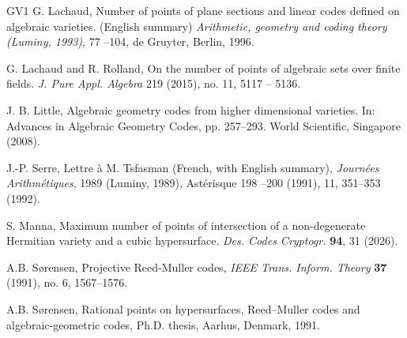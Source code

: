 \documentclass[10pt,a4paper,oneside]{amsproc}
\begin{document}
\begin{thebibliography}{GV1}
G. Lachaud, 
Number of points of plane sections and linear codes defined on algebraic varieties. (English summary) \emph{Arithmetic, geometry and coding theory (Luminy, 1993)}, 77 --104, de Gruyter, Berlin, 1996.


G. Lachaud and R. Rolland, On the number of points of algebraic sets over finite fields. \emph{J. Pure Appl. Algebra} 219 (2015), no. 11, 5117 -- 5136. 

J. B. Little, Algebraic geometry codes from higher dimensional varieties. In: Advances in Algebraic
Geometry Codes, pp. 257–293. World Scientific, Singapore (2008).

 J.-P. Serre, Lettre \`a M. Tsfasman (French, with English summary), \emph{Journ{\'e}es Arithm{\'e}tiques}, 1989 (Luminy, 1989), Ast{\'e}risque 198 --200 (1991), 11, 351--353 (1992).


S. Manna, Maximum number of points of intersection of a non-degenerate Hermitian variety and a cubic hypersurface. \emph{Des. Codes Cryptogr.} \textbf{94}, 31 (2026).

 A.B.  S{\o}rensen, Projective Reed-Muller codes, \emph{IEEE Trans. Inform. Theory} {\bf 37} (1991), no. 6, 1567--1576.

 A.B. S{\o}rensen, Rational points on hypersurfaces, Reed–Muller codes and algebraic-geometric codes, Ph.D. thesis, Aarhus, Denmark, 1991.

\end{thebibliography}
\end{document}
